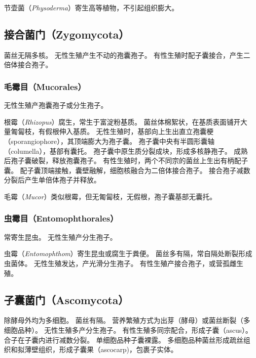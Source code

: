 \documentclass[11pt]{article}
\begin{document}
节壶菌（\textit{Physoderma}）寄生高等植物，不引起组织膨大。

\subsection{接合菌门（Zygomycota）}
菌丝无隔多核。
无性生殖产生不动的孢囊孢子。
有性生殖时配子囊接合，产生二倍体接合孢子。

\subsubsection{毛霉目（Mucorales）}
无性生殖产孢囊孢子或分生孢子。

\newline

根霉（\textit{Rhizopus}）腐生，常生于富淀粉基质。
菌丝体棉絮状，在基质表面铺开大量匍匐枝，有假根伸入基质。
无性生殖时，基部向上生出直立孢囊梗（sporangiophore），其顶端膨大为孢子囊。
孢子囊中央有半圆形囊轴（columella），基部有囊托。
孢子囊中原生质分裂成块，形成多核静孢子。
成熟后孢子囊破裂，释放孢囊孢子。
有性生殖时，两个不同宗的菌丝上生出有柄配子囊。
配子囊顶端接触，囊壁融解，细胞核融合为二倍体接合孢子。
接合孢子减数分裂后产生单倍体孢子并释放。

\newline

毛霉（\textit{Mucor}）类似根霉，但无匍匐枝，无假根，孢子囊基部无囊托。

\subsubsection{虫霉目（Entomophthorales）}
常寄生昆虫。
无性生殖产分生孢子。

\newline

虫霉（\textit{Entomophthom}）寄生昆虫或腐生于粪便。
菌丝多有隔，常自隔处断裂形成虫菌体。
无性生殖发达，产光滑分生孢子。
有性生殖产接合孢子，或营孤雌生殖。

\subsection{子囊菌门（Ascomycota）}
除酵母外均为多细胞。
菌丝有隔。
营养繁殖方式为出芽（酵母）或菌丝断裂（多细胞品种）。
无性生殖多产分生孢子。
有性生殖多同宗配合，形成子囊（ascus）。
合子在子囊内进行减数分裂。
单细胞品种子囊裸露。
多细胞品种菌丝形成疏丝组织和拟薄壁组织，形成子囊果（ascocarp)，包裹子实体。

\newline
\end{document}
